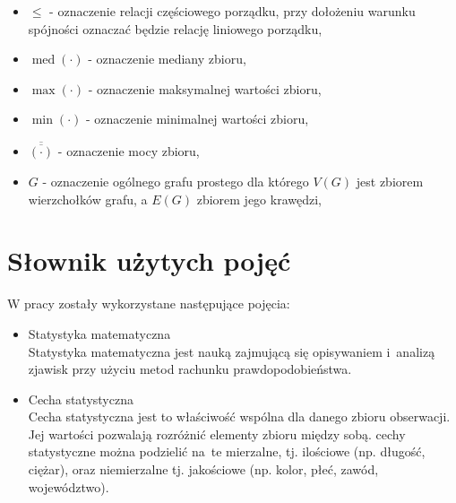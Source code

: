 \documentclass[12pt,a4paper]{report}
\newcommand{\mediana}{\operatorname{med}}
\newcommand{\licznosc}[1]{\overline{\overline{#1}}}
\begin{document}
\begin{itemize}
\item $\leq$ - oznaczenie relacji częściowego porządku, przy dołożeniu warunku spójności oznaczać będzie relację liniowego porządku,
\item $\mediana{(\cdot)}$ - oznaczenie mediany zbioru,
\item $\max{(\cdot)}$ - oznaczenie maksymalnej wartości zbioru,
\item $\min{(\cdot)}$ - oznaczenie minimalnej wartości zbioru,
\item $\licznosc{(\cdot)}$ - oznaczenie mocy zbioru,
\item $G$ - oznaczenie ogólnego grafu prostego dla którego $V(G)$ jest zbiorem wierzchołków grafu, a $E(G)$ zbiorem jego krawędzi,




\end{itemize}


\section{Słownik użytych pojęć}
W pracy zostały wykorzystane następujące pojęcia:
\begin{itemize}
\item Statystyka matematyczna \cite[w oparciu o rozdział 1]{krysicki1999}\\
Statystyka matematyczna jest nauką zajmującą się opisywaniem i~analizą zjawisk przy użyciu metod rachunku prawdopodobieństwa. 


 
 
\item Cecha statystyczna \cite[Rozdział 1]{krysicki1999}\\
Cecha statystyczna jest to właściwość wspólna dla danego zbioru obserwacji. Jej wartości pozwalają rozróżnić elementy zbioru między sobą. cechy statystyczne można podzielić na~te mierzalne, tj. ilościowe (np. długość, ciężar), oraz niemierzalne tj. jakościowe (np. kolor, płeć, zawód, województwo).

\end{itemize}
\end{document}
